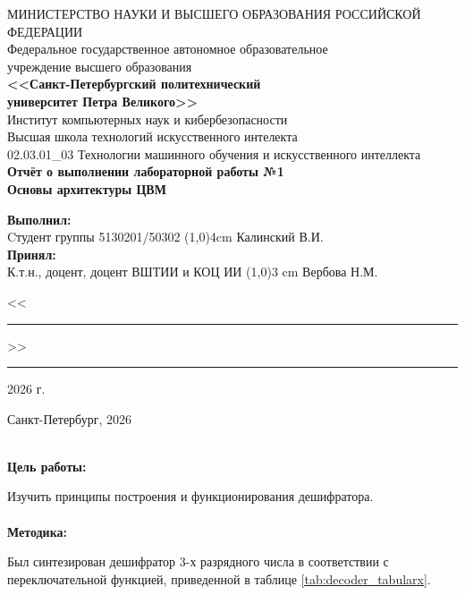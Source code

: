 \documentclass[14pt, a4paper]{extarticle}
\begin{document}
\thispagestyle{empty}
\begin{center}
    \hspace{0.2cm}МИНИСТЕРСТВО НАУКИ И ВЫСШЕГО ОБРАЗОВАНИЯ РОССИЙСКОЙ ФЕДЕРАЦИИ\\
    Федеральное государственное автономное образовательное\\
    учреждение высшего образования\\
    {\bf <<Санкт-Петербургский политехнический\\
    университет Петра Великого>>}\\
    Институт компьютерных наук и кибербезопасности\\
    Высшая школа технологий искусственного интелекта\\
    02.03.01\_03 Технологии машинного обучения и искусственного интеллекта\\
    \vspace{3cm}
    \Large\bf{
        Отчёт о выполнении лабораторной работы №1\\
        Основы архитектуры ЦВМ\\[1cm]
    }
\end{center}
\vspace{2cm}
\begin{flushleft}
    {\bf Выполнил:}\\
    Cтудент группы 5130201/50302 \hfill
    \line(1,0){4cm} \quad Калинский В.И.\\
    {\bf Принял:}\\
    К.т.н., доцент, доцент ВШТИИ и КОЦ ИИ \hfill
    \line(1,0){3 cm} \quad Вербова Н.М.\\[0.5cm]
    { \hfill<<\rule{1cm}{0.5pt}>>\rule{2cm}{0.5pt}\hspace{3pt}2026 г.}
\end{flushleft}
\vspace{1cm}
\begin{center}
    Санкт-Петербург, 2026
\end{center}
\newpage
\textbf{
	\\Цель работы:}

\noindent Изучить принципы построения и функционирования дешифратора.
\\\\
\textbf{Методика: }

\noindent Был синтезирован дешифратор 3-х разрядного числа в соответствии с переключательной функцией, приведенной в таблице \ref{tab:decoder_tabularx}. 
\end{document}
